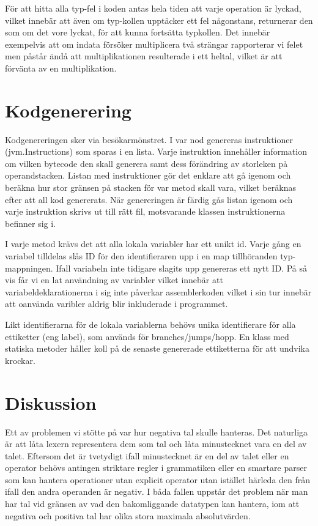 \documentclass[a4paper,11pt]{article}
\renewcommand{\*}[0]{\cdot}
\begin{document}
För att hitta alla typ-fel i koden antas hela tiden att varje operation är
lyckad, vilket innebär att även om typ-kollen upptäcker ett fel någonstans,
returnerar den som om det vore lyckat, för att kunna fortsätta typkollen. Det
innebär exempelvis att om indata försöker multiplicera två strängar rapporterar
vi felet men påstår ändå att multiplikationen resulterade i ett heltal, vilket
är att förvänta av en multiplikation.

\section*{Kodgenerering}

Kodgenereringen sker via besökarmönstret. I var nod genereras instruktioner
(jvm.Instructions) som sparas i en lista. Varje instruktion innehåller
information om vilken bytecode den skall generera samt dess förändring av
storleken på operandstacken. Listan med instruktioner gör det enklare att gå
igenom och beräkna hur stor gränsen på stacken för var metod skall vara, vilket
beräknas efter att all kod genererats. När genereringen är färdig gås listan
igenom och varje instruktion skrivs ut till rätt fil, motsvarande klassen
instruktionerna befinner sig i.

I varje metod krävs det att alla lokala variabler har ett unikt id. Varje gång
en variabel tilldelas slås ID för den identifieraren upp i en map tillhöranden
typ-mappningen. Ifall variabeln inte tidigare slagits upp genereras ett nytt
ID. På så vis får vi en lat användning av variabler vilket innebär att
variabeldeklarationerna i sig inte påverkar assemblerkoden vilket i sin tur
innebär att oanvända varibler aldrig blir inkluderade i programmet.

Likt identifierarna för de lokala variablerna behövs unika identifierare för
alla ettiketter (eng label), som används för branches/jumps/hopp. En klass med
statiska metoder håller koll på de senaste genererade ettiketterna för att
undvika krockar.



\section*{Diskussion}

Ett av problemen vi stötte på var hur negativa tal skulle hanteras. Det
naturliga är att låta lexern representera dem som tal och låta minustecknet
vara en del av talet. Eftersom det är tvetydigt ifall minustecknet är en del av
talet eller en operator behövs antingen striktare regler i grammatiken eller en
smartare parser som kan hantera operationer utan explicit operator utan
istället härleda den från ifall den andra operanden är negativ. I båda fallen
uppstår det problem när man har tal vid gränsen av vad den bakomliggande
datatypen kan hantera, iom att negativa och positiva tal har olika stora
maximala absolutvärden.
\end{document}
